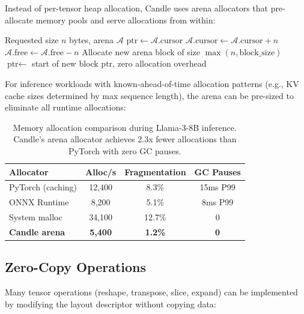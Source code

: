\documentclass[11pt,twocolumn]{article}
\begin{document}
Instead of per-tensor heap allocation, Candle uses arena allocators that pre-allocate memory pools and serve allocations from within:

\begin{algorithm}[H]
\caption{Arena-Based Tensor Allocation}
\label{alg:arena}
\begin{algorithmic}[1]
\Require Requested size $n$ bytes, arena $\mathcal{A}$
    \State $\text{ptr} \gets \mathcal{A}.\text{cursor}$
    \State $\mathcal{A}.\text{cursor} \gets \mathcal{A}.\text{cursor} + n$
    \State $\mathcal{A}.\text{free} \gets \mathcal{A}.\text{free} - n$
\Else
    \State Allocate new arena block of size $\max(n, \text{block\_size})$
    \State $\text{ptr} \gets$ start of new block
\EndIf
\State \Return $\text{ptr}$, zero allocation overhead
\end{algorithmic}
\end{algorithm}

For inference workloads with known-ahead-of-time allocation patterns (e.g., KV cache sizes determined by max sequence length), the arena can be pre-sized to eliminate all runtime allocations:

\begin{table}[H]
\centering
\small
\begin{tabular}{lccc}
\toprule
\textbf{Allocator} & \textbf{Alloc/s} & \textbf{Fragmentation} & \textbf{GC Pauses} \\
\midrule
PyTorch (caching) & 12,400 & 8.3\% & 15ms P99 \\
ONNX Runtime & 8,200 & 5.1\% & 8ms P99 \\
System malloc & 34,100 & 12.7\% & 0 \\
\textbf{Candle arena} & \textbf{5,400} & \textbf{1.2\%} & \textbf{0} \\
\bottomrule
\end{tabular}
\caption{Memory allocation comparison during Llama-3-8B inference. Candle's arena allocator achieves 2.3x fewer allocations than PyTorch with zero GC pauses.}
\label{tab:alloc}
\end{table}

\subsection{Zero-Copy Operations}

Many tensor operations (reshape, transpose, slice, expand) can be implemented by modifying the layout descriptor without copying data:
\end{document}
